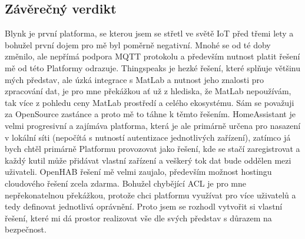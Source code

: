 \subsection{Závěrečný verdikt}
Blynk je první platforma, se kterou jsem se střetl ve světě IoT před třemi lety a bohužel první dojem pro mě byl poměrně negativní. Mnohé se od té doby změnilo, ale nepřímá podpora MQTT protokolu a především nutnost platit řešení mě od této Platformy odrazuje. Thingspeaks je hezké řešení, které splňuje většinu mých představ, ale úzká integrace s MatLab a nutnost jeho znalosti pro zpracování dat, je pro mne překážkou ať už z hlediska, že MatLab nepoužívám, tak více z pohledu ceny MatLab prostředí a celého ekosystému. Sám se považuji za OpenSource zastánce a proto mě to táhne k těmto řešením. HomeAssistant je velmi progresivní a zajímáva platforma, která je ale primárně určena pro nasazení v lokální síti (nepočítá s nutností autentizace jednotlivých zařízení), zatímco já bych chtěl primárně Platformu provozovat jako řešení, kde se stačí zaregistrovat a každý kutil může přidávat vlastní zařízení a veškerý tok dat bude oddělen mezi uživateli. OpenHAB řešení mě velmi zaujalo, především možnost hostingu cloudového řešení zcela zdarma. Bohužel chybějící ACL je pro mne nepřekonatelnou překážkou, protože chci platformu využívat pro více uživatelů a tedy definovat jednotlivá oprávnění. Proto jsem se rozhodl vytvořit si vlastní řešení, které mi dá prostor realizovat vše dle svých představ s důrazem na bezpečnost.

